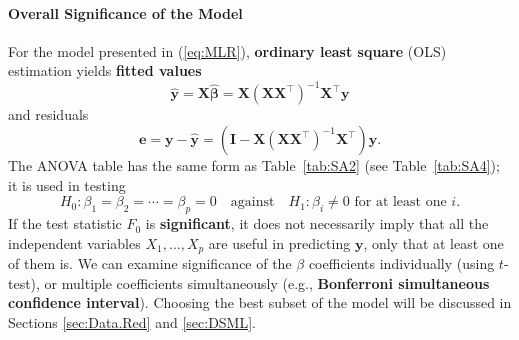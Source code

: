 \paragraph{Overall Significance of the Model}
For the model presented in (\ref{eq:MLR}), \textbf{ordinary least square} (OLS) estimation yields \textbf{fitted values} $$\bm{\hat{y}}=\bm{X\hat{\beta}}=\bm{X}(\bm{XX}^{\!\top})^{-1}\bm{X}^{\!\top}\bm{y}$$ and residuals $$\bm{e}=\bm{y}-\bm{\hat{y}}=(\bm{I}-\bm{X}(\bm{XX}^{\!\top})^{-1}\bm{X}^{\!\top})\bm{y}.$$ The ANOVA table has the same form as Table~\ref{tab:SA2} (see Table~\ref{tab:SA4}); it is used in testing $$H_{0}: \beta_{1} = \beta_{2} = \cdots = \beta_{p}=0\quad\mbox{against}\quad H_{1}: \beta_{i} \neq 0 \text{ for at least one  } i.$$ If the test statistic $F_{0}$ is \textbf{significant}, it does not necessarily imply that all the independent variables $X_1, \ldots, X_p$ are useful in predicting $\mathbf{y}$, only that at least one of them is. We can examine significance of the $\beta$ coefficients individually (using $t$-test), or multiple coefficients simultaneously (e.g., \textbf{Bonferroni simultaneous confidence interval}). Choosing the best subset of the model will be discussed in Sections \ref{sec:Data.Red} and \ref{sec:DSML}.

